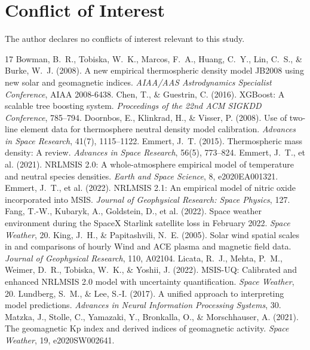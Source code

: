 \documentclass[11pt]{article}
\begin{document}
\section*{Conflict of Interest}
The author declares no conflicts of interest relevant to this study.

\begin{thebibliography}{17}
\setlength{\itemsep}{1pt}\small
{} Bowman, B.~R., Tobiska, W.~K., Marcos, F.~A., Huang, C.~Y., Lin, C.~S., \& Burke, W.~J. (2008). A new empirical thermospheric density model JB2008 using new solar and geomagnetic indices. \textit{AIAA/AAS Astrodynamics Specialist Conference}, AIAA 2008-6438.
 Chen, T., \& Guestrin, C. (2016). XGBoost: A scalable tree boosting system. \textit{Proceedings of the 22nd ACM SIGKDD Conference}, 785--794.
 Doornbos, E., Klinkrad, H., \& Visser, P. (2008). Use of two-line element data for thermosphere neutral density model calibration. \textit{Advances in Space Research}, 41(7), 1115--1122.
 Emmert, J.~T. (2015). Thermospheric mass density: A review. \textit{Advances in Space Research}, 56(5), 773--824.
 Emmert, J.~T., et al. (2021). NRLMSIS 2.0: A whole-atmosphere empirical model of temperature and neutral species densities. \textit{Earth and Space Science}, 8, e2020EA001321.
 Emmert, J.~T., et al. (2022). NRLMSIS 2.1: An empirical model of nitric oxide incorporated into MSIS. \textit{Journal of Geophysical Research: Space Physics}, 127.
 Fang, T.-W., Kubaryk, A., Goldstein, D., et al. (2022). Space weather environment during the SpaceX Starlink satellite loss in February 2022. \textit{Space Weather}, 20.
 King, J.~H., \& Papitashvili, N.~E. (2005). Solar wind spatial scales in and comparisons of hourly Wind and ACE plasma and magnetic field data. \textit{Journal of Geophysical Research}, 110, A02104.
 Licata, R.~J., Mehta, P.~M., Weimer, D.~R., Tobiska, W.~K., \& Yoshii, J. (2022). MSIS-UQ: Calibrated and enhanced NRLMSIS 2.0 model with uncertainty quantification. \textit{Space Weather}, 20.
 Lundberg, S.~M., \& Lee, S.-I. (2017). A unified approach to interpreting model predictions. \textit{Advances in Neural Information Processing Systems}, 30.
 Matzka, J., Stolle, C., Yamazaki, Y., Bronkalla, O., \& Morschhauser, A. (2021). The geomagnetic Kp index and derived indices of geomagnetic activity. \textit{Space Weather}, 19, e2020SW002641.

\end{thebibliography}
\end{document}

